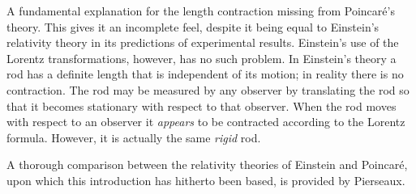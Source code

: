 \documentclass[10pt, fleqn,final,showtrims,oldfontcommands, article,a4paper,oneside]{memoir} %
\newcommand{\aether}{\ae ther}
\newcommand{\Poincare}{Poincar{\'e}}
\begin{document}
A fundamental explanation for the length contraction  missing from \Poincare's theory.
This gives it an incomplete feel, 
despite it being equal to Einstein's relativity theory in its predictions of experimental results\cite{Pierseaux2001}.
Einstein's use of the Lorentz transformations, however, has no such problem.
In Einstein's theory
%
a rod has a definite length that is independent  of its motion;
in reality there is no  contraction.
The rod may be measured by any observer by translating the rod so that it becomes stationary with respect to that observer.
When the rod moves with respect to an observer it {\em appears} to be contracted according to the Lorentz formula.
However, it is actually the same {\em rigid} rod\cite{Pierseaux2001, Pierseaux2005}. %

A thorough comparison between the relativity theories of Einstein and \Poincare,
upon which this introduction has hitherto been  based, is provided by 
Pierseaux\cite{Pierseaux2001, Pierseaux2005}.



%
%
\end{document}
